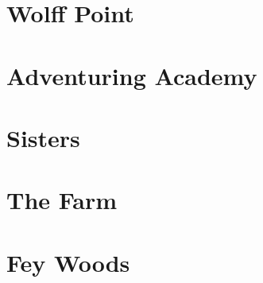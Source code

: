 

\begin{multicols}{2}

\section{Wolff Point}


\section{Adventuring Academy}


\section{Sisters}


\section{The Farm}


\section{Fey Woods}


\end{multicols}

